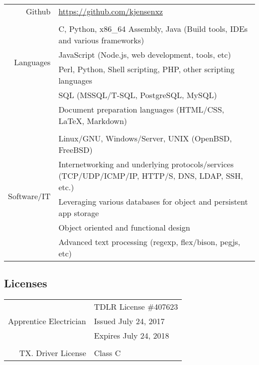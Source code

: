 \documentclass[letterpaper,]{article}
\begin{document}
\begin{center}
\begin{tabular}{r|l}
	Github & \href{https://github.com/kjensenxz}{https://github.com/kjensenxz} \\
	\\
	\multirow{4}{*}{Languages} & C, Python, x86\_64 Assembly, Java (Build tools, IDEs and various frameworks) \\
			& JavaScript (Node.js, web development, tools, etc) \\
			& Perl, Python, Shell scripting, PHP, other scripting languages \\
			& SQL (MSSQL/T-SQL, PostgreSQL, MySQL) \\
			& Document preparation languages (HTML/CSS, \LaTeX, Markdown) \\
	\\
	\multirow{5}{*}{Software/IT} & Linux/GNU, Windows/Server, UNIX (OpenBSD, FreeBSD) \\
				     & Internetworking and underlying protocols/services (TCP/UDP/ICMP/IP, HTTP/S, DNS, LDAP, SSH, etc.)  \\
				     & Leveraging various databases for object and persistent app storage \\
				     & Object oriented and functional design \\
				     & Advanced text processing (regexp, flex/bison, pegjs, etc) \\
\end{tabular}
\end{center}

\subsection{Licenses}\label{competencies}

\begin{center}
\begin{tabular}{r|l}
	\multirow{3}{*}{Apprentice Electrician } & TDLR License \#407623 \\
			& Issued July 24, 2017 \\
			& Expires July 24, 2018 \\
	\\
	\multirow{1}{*}{TX. Driver License} & Class C \\
\end{tabular}
\end{center}
\end{document}
